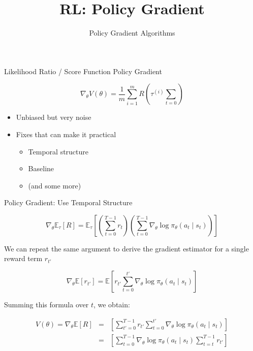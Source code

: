 


\title[Reinforcement Learning: Big Picture]{RL: Policy Gradient}
\subtitle{Policy Gradient Algorithms}




	
	\maketitle

\begin{frame}[c]{Likelihood Ratio / Score Function Policy Gradient}
	
	
	$$\nabla_\theta V(\theta) = \frac{1}{m} \sum_{i=1}^{m} R(\tau^{(i)} \sum_{t=0}) $$
	
	\begin{itemize}
		\item Unbiased but very noise
		\item Fixes that can make it practical
		\begin{itemize}
			\item Temporal structure
			\item Baseline
			\item (and some more)
		\end{itemize}
		
	\end{itemize}
	
\end{frame}
\begin{frame}[c]{Policy Gradient: Use Temporal Structure}
	
$$ \nabla_\theta \mathbb{E}_\tau [R] = \mathbb{E}_\tau \left[ \left(\sum_{t=0}^{T-1} r_t\right) \left( \sum_{t=0}^{T-1} \nabla_\theta \log \pi_\theta(a_t \mid s_t) \right) \right]$$
	
We can repeat the same argument to derive the gradient estimator for a single reward term $r_{t'}$

$$\nabla_\theta \mathbb{E} [r_{t'}] = \mathbb{E} \left[r_{t'} \sum_{t=0}^{t'} \nabla_\theta \log \pi_\theta (a_t \mid s_t)\right] $$
	
Summing this formula over $t$, we obtain:

\begin{eqnarray}
V(\theta) = \nabla_\theta \mathbb{E}[R] &=& \left[ \sum_{t'=0}^{T-1} r_{t'} \sum^{t'}_{t=0} \nabla_\theta \log \pi_\theta (a_t \mid s_t)  \right]\nonumber\\
&=& \left[ \sum_{t=0}^{T-1}  \nabla_\theta \log \pi_\theta (a_t \mid s_t)   \sum^{T-1}_{t=t} r_{t'}  \right]\nonumber
\end{eqnarray}

	
\end{frame}

